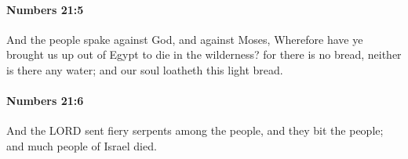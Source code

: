		\paragraph{Numbers 21:5} %
			\label{NUMBERS-21-5}

			And the people spake against God, and against Moses, Wherefore have ye brought us up out of Egypt to die in the wilderness? for there is no bread, neither is there any water; and our soul loatheth this light bread.


		\paragraph{Numbers 21:6} %
			\label{NUMBERS-21-6}

			And the LORD sent fiery serpents among the people, and they bit the people; and much people of Israel died.


